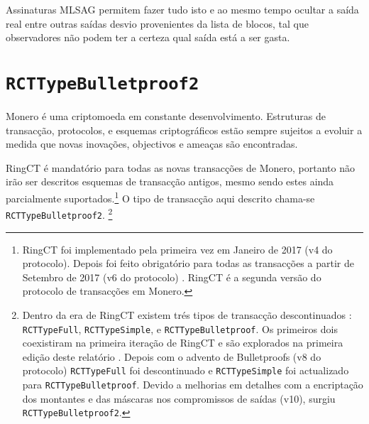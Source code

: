 Assinaturas MLSAG permitem fazer tudo isto e ao mesmo tempo ocultar a saída real entre outras saídas desvio provenientes da lista de blocos, tal que observadores não podem ter a certeza qual saída está a ser gasta.
 

\section{{\tt RCTTypeBulletproof2}}
\label{sec:RCTTypeBulletproof2}

Monero é uma criptomoeda em constante desenvolvimento. Estruturas de transacção, protocolos, e esquemas criptográficos estão sempre sujeitos a evoluir a medida que novas inovações, objectivos e ameaças são encontradas.


RingCT é mandatório para todas as novas transacções de Monero, portanto não irão ser descritos esquemas de transacção antigos, mesmo sendo estes ainda parcialmente suportados.\footnote{RingCT foi implementado pela primeira vez em Janeiro de 2017 (v4 do protocolo). Depois foi feito obrigatório para todas as transacções a partir de Setembro de 2017 (v6 do protocolo) \cite{ringct-dates}. RingCT é a segunda versão do protocolo de transacções em Monero.}
O tipo de transacção aqui descrito chama-se {\tt RCTTypeBulletproof2}.  
\footnote{Dentro da era de RingCT existem trés tipos de transacção descontinuados : {\tt RCTTypeFull}, {\tt RCTTypeSimple}, e {\tt RCTTypeBulletproof}. Os primeiros dois coexistiram na primeira iteração de RingCT e são explorados na primeira edição deste relatório \cite{ztm-1}. Depois com o advento de Bulletproofs (v8 do protocolo) {\tt RCTTypeFull} foi descontinuado e {\tt RCTTypeSimple} foi actualizado para {\tt RCTTypeBulletproof}. Devido a melhorias em detalhes com a encriptação dos montantes e das máscaras nos compromissos de saídas (v10), surgiu {\tt RCTTypeBulletproof2}.}  

